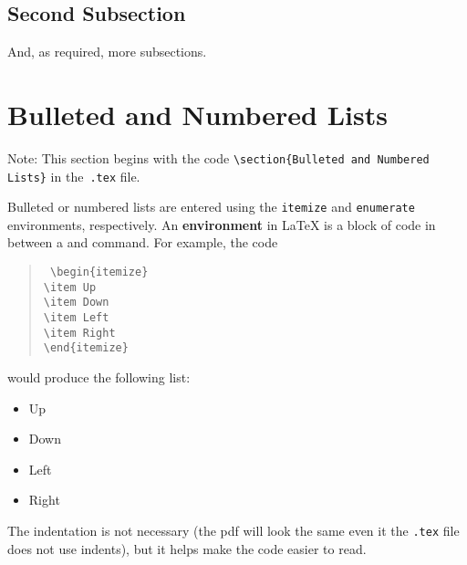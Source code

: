 
\subsection{Second Subsection}
And, as required, more subsections.

\section{Bulleted and Numbered Lists}
Note: This section begins with the code 
\texttt{\textbackslash{}section\{Bulleted and Numbered Lists\}} in 
the~\texttt{.tex} file.

Bulleted or numbered lists are entered using the \texttt{itemize} and 
\texttt{enumerate} environments, respectively. An \textbf{environment} in 
\LaTeX{} is a block of code in between a  and  command. For 
example, the code
\begin{quote}\tt
	\textbackslash{}begin\{itemize\} \\[-0.5em]
	\hspace*{2em}\textbackslash{}item Up \\[-0.5em]
	\hspace*{2em}\textbackslash{}item Down \\[-0.5em]
	\hspace*{2em}\textbackslash{}item Left \\[-0.5em]
	\hspace*{2em}\textbackslash{}item Right \\[-0.5em]
	\textbackslash{}end\{itemize\}
\end{quote}
would produce the following list:
\begin{itemize} \item Up \item Down \item Left \item Right \end{itemize}
The indentation is not necessary (the pdf will look the same even it the 
\texttt{.tex} file does not use indents), but it helps make the code easier to 
read.

